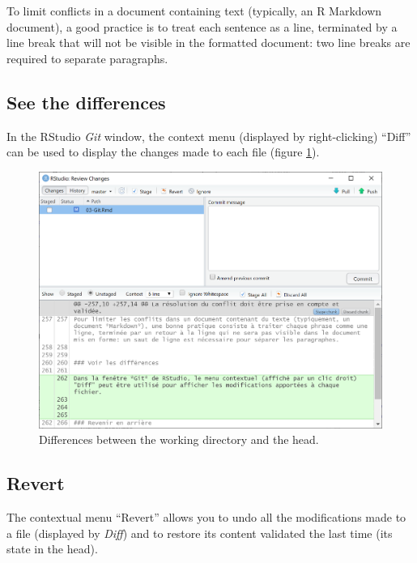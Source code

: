 \documentclass[
  12pt,
  american,
  a4paper,
  extrafontsizes,onecolumn,openright
  ]{memoir}
\begin{document}
To limit conflicts in a document containing text (typically, an R Markdown document), a good practice is to treat each sentence as a line, terminated by a line break that will not be visible in the formatted document: two line breaks are required to separate paragraphs.

\hypertarget{see-the-differences}{%
\subsection{See the differences}\label{see-the-differences}}

In the RStudio \emph{Git} window, the context menu (displayed by right-clicking) \enquote{Diff} can be used to display the changes made to each file (figure \ref{fig:git-diff}).



\scriptsize

\begin{figure}

{\centering \includegraphics[width=0.8\linewidth]{images/git-diff} 

}

\caption{Differences between the working directory and the head.}\label{fig:git-diff}
\end{figure}

\normalsize

\hypertarget{revert}{%
\subsection{Revert}\label{revert}}

The contextual menu \enquote{Revert} allows you to undo all the modifications made to a file (displayed by \emph{Diff}) and to restore its content validated the last time (its state in the head).
\end{document}

